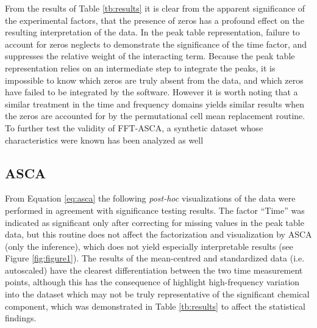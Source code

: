 \documentclass[preprint,12pt]{elsarticle}
\begin{document}
From the results of Table \ref{tb:results} it is clear from the apparent significance of the experimental factors, that the presence of zeros has a profound effect on the resulting interpretation of the data. In the peak table representation, failure to account for zeros neglects to demonstrate the significance of the time factor, and suppresses the relative weight of the interacting term. Because the peak table representation relies on an intermediate step to integrate the peaks, it is impossible to know which zeros are truly absent from the data, and which zeros have failed to be integrated by the software. However it is worth noting that a similar treatment in the time and frequency domains yields similar results when the zeros are accounted for by the permutational cell mean replacement routine. To further test the validity of FFT-ASCA, a synthetic dataset whose characteristics were known has been analyzed as well

\subsection{ASCA}

From Equation \ref{eq:asca} the following \textit{post-hoc} visualizations of the data were performed in agreement with significance testing results. The factor ``Time'' was indicated as significant only after correcting for missing values in the peak table data, but this routine does not affect the factorization and visualization by ASCA (only the inference), which does not yield especially interpretable results (see Figure \ref{fig:figure1}). The results of the mean-centred and standardized data (i.e. autoscaled) have the clearest differentiation between the two time measurement points, although this has the consequence of highlight high-frequency variation into the dataset which may not be truly representative of the significant chemical component, which was demonstrated in Table \ref{tb:results} to affect the statistical findings.
\end{document}
